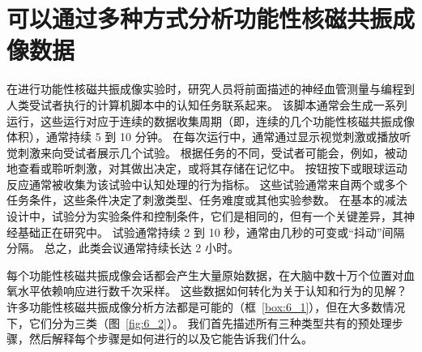 \section{可以通过多种方式分析功能性核磁共振成像数据}

在进行功能性核磁共振成像实验时，研究人员将前面描述的神经血管测量与编程到人类受试者执行的计算机脚本中的认知任务联系起来。
该脚本通常会生成一系列运行，这些运行对应于连续的数据收集周期（即，连续的几个功能性核磁共振成像体积），通常持续 5 到 10 分钟。 
在每次运行中，通常通过显示视觉刺激或播放听觉刺激来向受试者展示几个试验。 
根据任务的不同，受试者可能会，例如，被动地查看或聆听刺激，对其做出决定，或将其存储在记忆中。 
按钮按下或眼球运动反应通常被收集为该试验中认知处理的行为指标。 
这些试验通常来自两个或多个任务条件，这些条件决定了刺激类型、任务难度或其他实验参数。 
在基本的减法设计中，试验分为实验条件和控制条件，它们是相同的，但有一个关键差异，其神经基础正在研究中。 
试验通常持续 2 到 10 秒，通常由几秒的可变或“抖动”间隔分隔。 
总之，此类会议通常持续长达 2 小时。


每个功能性核磁共振成像会话都会产生大量原始数据，在大脑中数十万个位置对血氧水平依赖响应进行数千次采样。 
这些数据如何转化为关于认知和行为的见解？ 
许多功能性核磁共振成像分析方法都是可能的（框~\ref{box:6_1}），但在大多数情况下，它们分为三类（图~\ref{fig:6_2}）。 
我们首先描述所有三种类型共有的预处理步骤，然后解释每个步骤是如何进行的以及它能告诉我们什么。



